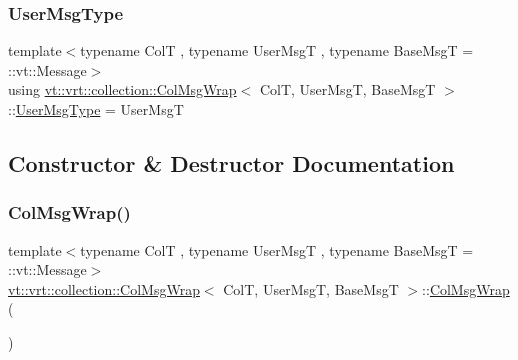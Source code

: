 \mbox{\label{structvt_1_1vrt_1_1collection_1_1_col_msg_wrap_a168446c6b2feea3a003dbfa02f21e227}} 
\subsubsection{\texorpdfstring{User\+Msg\+Type}{UserMsgType}}
{\footnotesize\ttfamily template$<$typename ColT , typename User\+MsgT , typename Base\+MsgT  = \+::vt\+::\+Message$>$ \\
using \hyperlink{structvt_1_1vrt_1_1collection_1_1_col_msg_wrap}{vt\+::vrt\+::collection\+::\+Col\+Msg\+Wrap}$<$ ColT, User\+MsgT, Base\+MsgT $>$\+::\hyperlink{structvt_1_1vrt_1_1collection_1_1_collection_message_ace5b4eaa94f5b209ae321edd6c0b6c19}{User\+Msg\+Type} =  User\+MsgT}



\subsection{Constructor \& Destructor Documentation}
\mbox{\label{structvt_1_1vrt_1_1collection_1_1_col_msg_wrap_a341d1ea25fb9181d1c06ab66df1478f9}} 
\subsubsection{\texorpdfstring{Col\+Msg\+Wrap()}{ColMsgWrap()}\hspace{0.1cm}{\footnotesize\ttfamily [1/3]}}
{\footnotesize\ttfamily template$<$typename ColT , typename User\+MsgT , typename Base\+MsgT  = \+::vt\+::\+Message$>$ \\
\hyperlink{structvt_1_1vrt_1_1collection_1_1_col_msg_wrap}{vt\+::vrt\+::collection\+::\+Col\+Msg\+Wrap}$<$ ColT, User\+MsgT, Base\+MsgT $>$\+::\hyperlink{structvt_1_1vrt_1_1collection_1_1_col_msg_wrap}{Col\+Msg\+Wrap} (\begin{DoxyParamCaption}{ }\end{DoxyParamCaption})\hspace{0.3cm}{\ttfamily [default]}}

